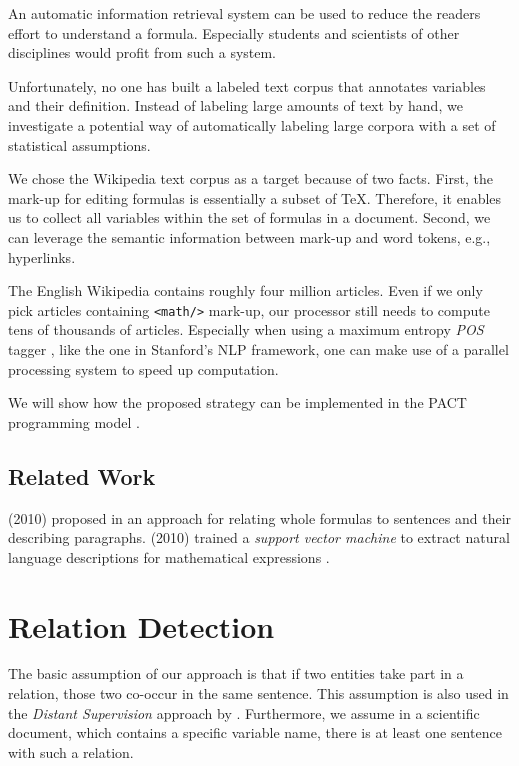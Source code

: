 \documentclass[runningheads]{llncs}
\begin{document}
An automatic information retrieval system can be used to reduce the readers effort to understand a formula. Especially students and scientists of other disciplines would profit from such a system.

Unfortunately, no one has built a labeled text corpus that annotates variables and their definition. Instead of labeling large amounts of text by hand, we investigate a potential way of automatically labeling large corpora with a set of statistical assumptions.

We chose the Wikipedia text corpus as a target because of two facts. First, the mark-up for editing formulas is essentially a subset of \TeX. Therefore, it enables us to collect all variables within the set of formulas in a document. Second, we can leverage the semantic information between mark-up and word tokens, e.g., hyperlinks.

The English Wikipedia contains roughly four million articles. Even if we only pick articles containing \texttt{<math/>} mark-up, our processor still needs to compute tens of thousands of articles. Especially when using a maximum entropy \emph{POS} tagger \cite{Rathna96}, like the one in Stanford's NLP framework, one can make use of a parallel processing system to speed up computation.

We will show how the proposed strategy can be implemented in the PACT programming model \cite{Alexandrov2010}.


\subsection{Related Work}
\citeauthor{Quoc2010} (2010) proposed in \cite{Quoc2010} an approach for relating whole formulas to sentences and their describing paragraphs. \citeauthor{Yokoi} (2010) trained a \emph{support vector machine} to extract natural language descriptions for mathematical expressions \cite{Yokoi}.


\section{Relation Detection}
The basic assumption of our approach is that if two entities take part in a relation, those two co-occur in the same sentence. This assumption is also used in the \emph{Distant Supervision} \cite{Mintz2008} approach by \citeauthor{Mintz2008}. Furthermore, we assume in a scientific document, which contains a specific variable name, there is at least one sentence with such a relation.
\end{document}
